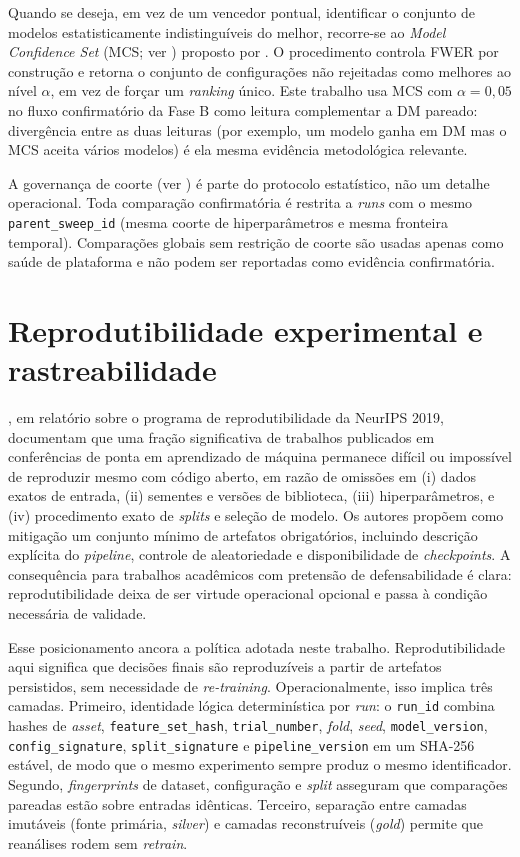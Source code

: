 Quando se deseja, em vez de um vencedor pontual, identificar o conjunto de modelos estatisticamente indistinguíveis do melhor, recorre-se ao \textit{Model Confidence Set} (MCS; ver ) proposto por \cite{HANSEN2011MCS}. O procedimento controla FWER por construção e retorna o conjunto de configurações não rejeitadas como melhores ao nível $\alpha$, em vez de forçar um \textit{ranking} único. Este trabalho usa MCS com $\alpha = 0{,}05$ no fluxo confirmatório da Fase B como leitura complementar a DM pareado: divergência entre as duas leituras (por exemplo, um modelo ganha em DM mas o MCS aceita vários modelos) é ela mesma evidência metodológica relevante.

A governança de coorte (ver ) é parte do protocolo estatístico, não um detalhe operacional. Toda comparação confirmatória é restrita a \textit{runs} com o mesmo \texttt{parent\_sweep\_id} (mesma coorte de hiperparâmetros e mesma fronteira temporal). Comparações globais sem restrição de coorte são usadas apenas como saúde de plataforma e não podem ser reportadas como evidência confirmatória.

\section{Reprodutibilidade experimental e rastreabilidade}
\cite{PINEAU2021REPRODUCIBILITY}, em relatório sobre o programa de reprodutibilidade da NeurIPS 2019, documentam que uma fração significativa de trabalhos publicados em conferências de ponta em aprendizado de máquina permanece difícil ou impossível de reproduzir mesmo com código aberto, em razão de omissões em (i) dados exatos de entrada, (ii) sementes e versões de biblioteca, (iii) hiperparâmetros, e (iv) procedimento exato de \textit{splits} e seleção de modelo. Os autores propõem como mitigação um conjunto mínimo de artefatos obrigatórios, incluindo descrição explícita do \textit{pipeline}, controle de aleatoriedade e disponibilidade de \textit{checkpoints}. A consequência para trabalhos acadêmicos com pretensão de defensabilidade é clara: reprodutibilidade deixa de ser virtude operacional opcional e passa à condição necessária de validade.

Esse posicionamento ancora a política adotada neste trabalho. Reprodutibilidade aqui significa que decisões finais são reproduzíveis a partir de artefatos persistidos, sem necessidade de \textit{re-training}. Operacionalmente, isso implica três camadas. Primeiro, identidade lógica determinística por \textit{run}: o \texttt{run\_id} combina hashes de \textit{asset}, \texttt{feature\_set\_hash}, \texttt{trial\_number}, \textit{fold}, \textit{seed}, \texttt{model\_version}, \texttt{config\_signature}, \texttt{split\_signature} e \texttt{pipeline\_version} em um SHA-256 estável, de modo que o mesmo experimento sempre produz o mesmo identificador. Segundo, \textit{fingerprints} de dataset, configuração e \textit{split} asseguram que comparações pareadas estão sobre entradas idênticas. Terceiro, separação entre camadas imutáveis (fonte primária, \textit{silver}) e camadas reconstruíveis (\textit{gold}) permite que reanálises rodem sem \textit{retrain}.

